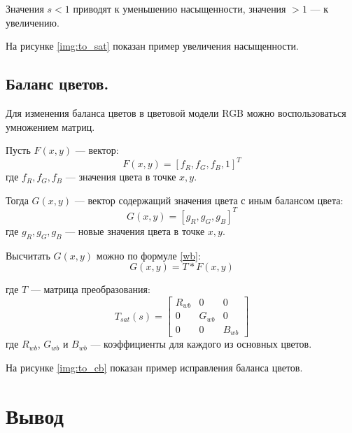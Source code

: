 Значения $s < 1$ приводят к уменьшению насыщенности, значения $> 1$ --- к увеличению. \cite{sat}

На рисунке \ref{img:to_sat} показан пример увеличения насыщенности.


\subsection{Баланс цветов.}

Для изменения баланса цветов в цветовой модели RGB можно воспользоваться умножением матриц.

Пусть $F(x,y)$ --- вектор:
\begin{equation}
	\label{F}
	F(x,y) = [f_R, f_G, f_B, 1]^T
\end{equation}
где $f_R, f_G, f_B$ --- значения цвета в точке $x,y$.

Тогда $G(x,y)$ --- вектор содержащий значения цвета с иным балансом цвета:
\begin{equation}
	\label{G}
	G(x,y) = [g_R, g_G, g_B]^T
\end{equation}
где $g_R, g_G, g_B$ --- новые значения цвета в точке $x,y$.

Высчитать $G(x,y)$ можно по формуле \ref{wb}:
\begin{equation}
	\label{wb}
	G(x,y) = T * F(x,y)
\end{equation}

где $T$ --- матрица преобразования:
\begin{equation}
	\label{twb}
	T_{sat}(s) = \begin{bmatrix}
		R_{wb} & 0 & 0 \\
		0 & G_{wb} & 0 \\ 
		0 & 0 & B_{wb} 
	\end{bmatrix}
\end{equation}
где $R_{wb}$, $G_{wb}$ и $B_{wb}$ --- коэффициенты для каждого из основных цветов.

На рисунке \ref{img:to_cb} показан пример исправления баланса цветов.


\section*{Вывод}

